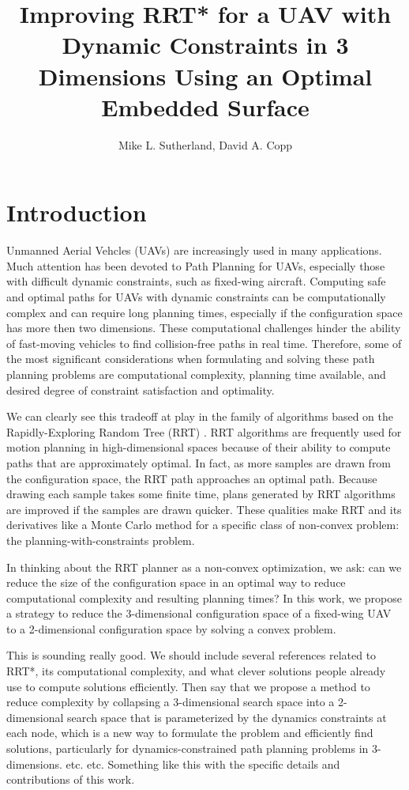 \documentclass[letterpaper, 12pt]{article}
\title{Improving RRT* for a UAV with Dynamic Constraints in 3 Dimensions Using an Optimal Embedded Surface}
\author{Mike L. Sutherland, David A. Copp}
\def\citationneeded{\color{magenta}{\small{[citation needed]}}\normalcolor}
\newcommand{\dac}[1]{\color{red}#1}
\begin{document}
\maketitle

\section{Introduction}
Unmanned Aerial Vehcles (UAVs) are increasingly used in many applications. Much attention has been devoted to Path Planning for UAVs, especially those with difficult dynamic constraints, such as fixed-wing aircraft. Computing safe and optimal paths for UAVs with dynamic constraints can be computationally complex and can require long planning times, especially if the configuration space has more then two dimensions. These computational challenges hinder the ability of fast-moving vehicles to find collision-free paths in real time. \citationneeded Therefore, some of the most significant considerations when formulating and solving these path planning problems are computational complexity, planning time available, and desired degree of constraint satisfaction and optimality. 

We can clearly see this tradeoff at play in the family of algorithms based on the Rapidly-Exploring Random Tree (RRT) \cite{lavalle2006}. RRT algorithms are frequently used for motion planning in high-dimensional spaces because of their ability to compute paths that are approximately optimal. In fact, as more samples are drawn from the configuration space, the RRT path approaches an optimal path. Because drawing each sample takes some finite time, plans generated by RRT algorithms are improved if the samples are drawn quicker. These qualities make RRT and its derivatives like a Monte Carlo method for a specific class of non-convex problem: the planning-with-constraints problem.

In thinking about the RRT planner as a non-convex optimization, we ask: can we reduce the size of the configuration space in an optimal way to reduce computational complexity and resulting planning times? In this work, we propose a strategy to reduce the 3-dimensional configuration space of a fixed-wing UAV to a 2-dimensional configuration space by solving a convex problem. 


{\dac This is sounding really good. We should include several references related to RRT*, its computational complexity, and what clever solutions people already use to compute solutions efficiently. Then say that we propose a method to reduce complexity by collapsing a 3-dimensional search space into a 2-dimensional search space that is parameterized by the dynamics constraints at each node, which is a new way to formulate the problem and efficiently find solutions, particularly for dynamics-constrained path planning problems in 3-dimensions. etc. etc. Something like this with the specific details and contributions of this work.}
\end{document}
